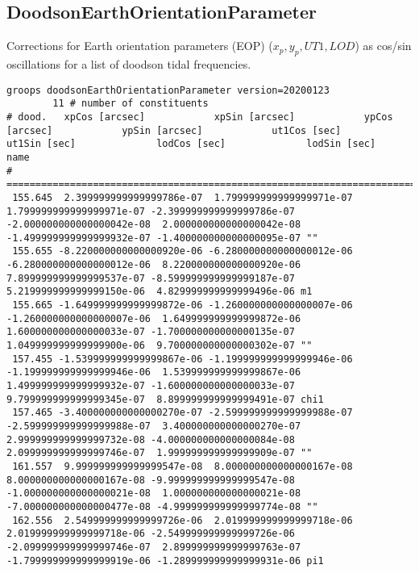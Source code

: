 \subsection{DoodsonEarthOrientationParameter}\label{general.fileFormat:doodsonEarthOrientationParameter}
Corrections for Earth orientation parameters (EOP) ($x_p, y_p, UT1, LOD$)
as cos/sin oscillations for a list of doodson tidal frequencies.

\begin{verbatim}
groops doodsonEarthOrientationParameter version=20200123
        11 # number of constituents
# dood.   xpCos [arcsec]            xpSin [arcsec]            ypCos [arcsec]            ypSin [arcsec]            ut1Cos [sec]              ut1Sin [sec]              lodCos [sec]              lodSin [sec]             name
# ===========================================================================================================================================================================================================================
 155.645  2.399999999999999786e-07  1.799999999999999971e-07  1.799999999999999971e-07 -2.399999999999999786e-07 -2.000000000000000042e-08  2.000000000000000042e-08 -1.499999999999999932e-07 -1.400000000000000095e-07 ""
 155.655 -8.220000000000000920e-06 -6.280000000000000012e-06 -6.280000000000000012e-06  8.220000000000000920e-06  7.899999999999999537e-07 -8.599999999999999187e-07  5.219999999999999150e-06  4.829999999999999496e-06 m1
 155.665 -1.649999999999999872e-06 -1.260000000000000007e-06 -1.260000000000000007e-06  1.649999999999999872e-06  1.600000000000000033e-07 -1.700000000000000135e-07  1.049999999999999900e-06  9.700000000000000302e-07 ""
 157.455 -1.539999999999999867e-06 -1.199999999999999946e-06 -1.199999999999999946e-06  1.539999999999999867e-06  1.499999999999999932e-07 -1.600000000000000033e-07  9.799999999999999345e-07  8.899999999999999491e-07 chi1
 157.465 -3.400000000000000270e-07 -2.599999999999999988e-07 -2.599999999999999988e-07  3.400000000000000270e-07  2.999999999999999732e-08 -4.000000000000000084e-08  2.099999999999999746e-07  1.999999999999999909e-07 ""
 161.557  9.999999999999999547e-08  8.000000000000000167e-08  8.000000000000000167e-08 -9.999999999999999547e-08 -1.000000000000000021e-08  1.000000000000000021e-08 -7.000000000000000477e-08 -4.999999999999999774e-08 ""
 162.556  2.549999999999999726e-06  2.019999999999999718e-06  2.019999999999999718e-06 -2.549999999999999726e-06 -2.099999999999999746e-07  2.899999999999999763e-07 -1.799999999999999919e-06 -1.289999999999999931e-06 pi1

\end{verbatim}
